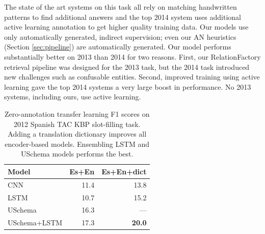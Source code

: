 The state of the art systems on this task all rely on matching handwritten patterns to find additional answers and the top 2014 system uses additional active learning annotation to get higher quality training data. Our models use only automatically generated, indirect supervision; even our AN heuristics (Section \ref{sec:pipeline}) are automatically generated. Our model performs substantially better on 2013 than 2014 for two reasons. First, our RelationFactory\citep{roth2014relationfactory} retrieval pipeline was designed for the 2013 task, but the 2014 task introduced new challenges such as confusable entities. Second, improved training using active learning gave the top 2014 systems a very large boost in performance. No 2013 systems, including ours, use active learning.




\begin{table}
\begin{center}
\begin{tabular}{|lrr|}
\hline
\bf Model & \bf Es+En & \bf Es+En+dict  \\
\hline\hline
CNN 		                    & 11.4     & 13.8	\\
LSTM 	                        & 10.7     & 15.2   \\
USchema                         & 16.3     & --- \\
\hline
USchema+LSTM                    & 17.3     & \bf 20.0 \\
\hline
\end{tabular}
\caption{Zero-annotation transfer learning F1 scores on 2012 Spanish TAC KBP slot-filling task. Adding a translation dictionary improves all encoder-based models. Ensembling LSTM and USchema models performs the best. \label{es-tac-table}}
\end{center}
\end{table}

